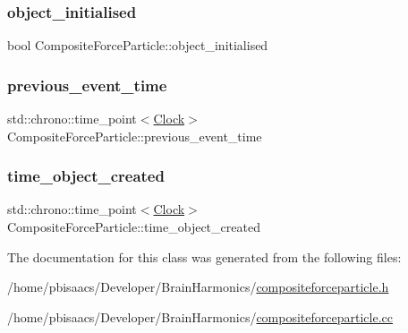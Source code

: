 \subsubsection{\texorpdfstring{object\+\_\+initialised}{object\_initialised}}
{\footnotesize\ttfamily bool Composite\+Force\+Particle\+::object\+\_\+initialised\hspace{0.3cm}{\ttfamily [private]}}

\mbox{\label{classCompositeForceParticle_ad9b33180a06a93964c089b698067e9c5}} 
\subsubsection{\texorpdfstring{previous\+\_\+event\+\_\+time}{previous\_event\_time}}
{\footnotesize\ttfamily std\+::chrono\+::time\+\_\+point$<$\mbox{\hyperlink{universe_8h_a0ef8d951d1ca5ab3cfaf7ab4c7a6fd80}{Clock}}$>$ Composite\+Force\+Particle\+::previous\+\_\+event\+\_\+time\hspace{0.3cm}{\ttfamily [private]}}

\mbox{\label{classCompositeForceParticle_a71308d96b2ba9adaebf20715af14c695}} 
\subsubsection{\texorpdfstring{time\+\_\+object\+\_\+created}{time\_object\_created}}
{\footnotesize\ttfamily std\+::chrono\+::time\+\_\+point$<$\mbox{\hyperlink{universe_8h_a0ef8d951d1ca5ab3cfaf7ab4c7a6fd80}{Clock}}$>$ Composite\+Force\+Particle\+::time\+\_\+object\+\_\+created\hspace{0.3cm}{\ttfamily [private]}}



The documentation for this class was generated from the following files\+:\begin{DoxyCompactItemize}
\item 
/home/pbisaacs/\+Developer/\+Brain\+Harmonics/\mbox{\hyperlink{compositeforceparticle_8h}{compositeforceparticle.\+h}}\item 
/home/pbisaacs/\+Developer/\+Brain\+Harmonics/\mbox{\hyperlink{compositeforceparticle_8cc}{compositeforceparticle.\+cc}}\end{DoxyCompactItemize}
